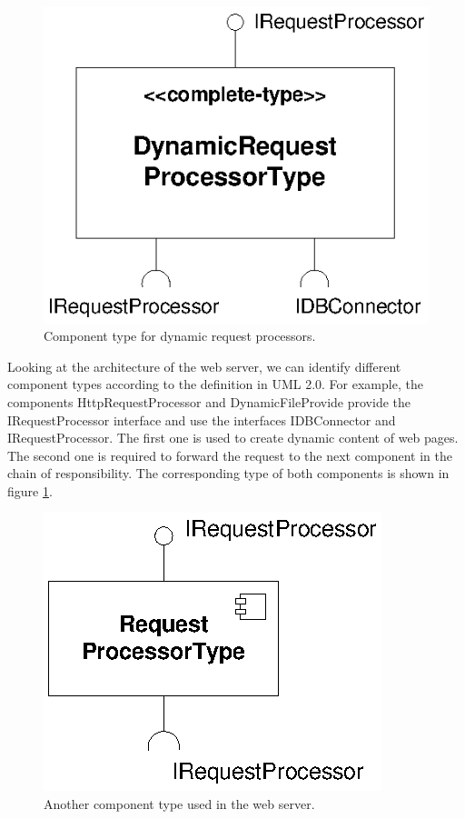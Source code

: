 \begin{figure}[htbp]
\centering
\includegraphics[scale=0.85]{example/DynamicRequestProcessorType}
\caption{Component type for dynamic request processors.}
\label{fig:DynamicRequestProcessorType}
\end{figure}

Looking at the architecture of the web server, we can identify different component types according to the definition in UML 2.0. For example, the components HttpRequestProcessor and DynamicFileProvide provide the IRequestProcessor interface and use the interfaces IDBConnector and IRequestProcessor. The first one is used to create dynamic content of web pages. The second one is required to forward the request to the next component in the chain of responsibility. The corresponding type of both components is shown in figure \ref{fig:DynamicRequestProcessorType}.

\begin{figure}[htbp]
\centering
\includegraphics[scale=0.85]{example/RequestProcessorType}
\caption{Another component type used in the web server.}
\label{fig:RequestProcessorType}
\end{figure}

